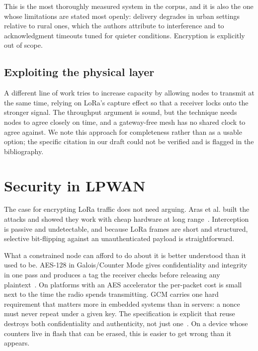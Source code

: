 \documentclass[conference]{IEEEtran}
\begin{document}
This is the most thoroughly measured system in the corpus, and it is also the
one whose limitations are stated most openly: delivery degrades in urban settings
relative to rural ones, which the authors attribute to interference and to
acknowledgment timeouts tuned for quieter conditions. Encryption is explicitly
out of scope.

\subsection{Exploiting the physical layer}

A different line of work tries to increase capacity by allowing nodes to transmit
at the same time, relying on LoRa's capture effect so that a receiver locks onto
the stronger signal. The throughput argument is sound, but the technique needs
nodes to agree closely on time, and a gateway-free mesh has no shared clock to
agree against. We note this approach for completeness rather than as a usable
option; the specific citation in our draft could not be verified and is flagged
in the bibliography.

\section{Security in LPWAN}\label{sec:security}

The case for encrypting LoRa traffic does not need arguing. Aras et al. built the
attacks and showed they work with cheap hardware at long
range~\cite{aras2017exploring}. Interception is passive and undetectable, and
because LoRa frames are short and structured, selective bit-flipping against an
unauthenticated payload is straightforward.

What a constrained node can afford to do about it is better understood than it
used to be. AES-128 in Galois/Counter Mode gives confidentiality and integrity in
one pass and produces a tag the receiver checks before releasing any
plaintext~\cite{dworkin2007gcm}. On platforms with an AES accelerator the
per-packet cost is small next to the time the radio spends transmitting. GCM
carries one hard requirement that matters more in embedded systems than in
servers: a nonce must never repeat under a given key. The specification is
explicit that reuse destroys both confidentiality and authenticity, not just
one~\cite{dworkin2007gcm}. On a device whose counters live in flash that can be
erased, this is easier to get wrong than it appears.
\end{document}
